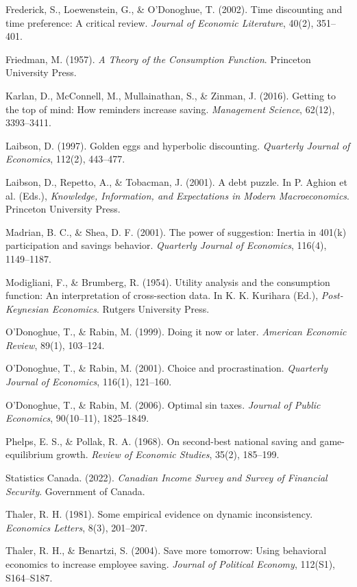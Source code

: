 \documentclass[12pt, letterpaper]{article}
\begin{document}
Frederick, S., Loewenstein, G., \& O'Donoghue, T. (2002). Time discounting and time preference: A critical review. \textit{Journal of Economic Literature}, 40(2), 351--401.

Friedman, M. (1957). \textit{A Theory of the Consumption Function}. Princeton University Press.

Karlan, D., McConnell, M., Mullainathan, S., \& Zinman, J. (2016). Getting to the top of mind: How reminders increase saving. \textit{Management Science}, 62(12), 3393--3411.

Laibson, D. (1997). Golden eggs and hyperbolic discounting. \textit{Quarterly Journal of Economics}, 112(2), 443--477.

Laibson, D., Repetto, A., \& Tobacman, J. (2001). A debt puzzle. In P. Aghion et al. (Eds.), \textit{Knowledge, Information, and Expectations in Modern Macroeconomics}. Princeton University Press.

Madrian, B. C., \& Shea, D. F. (2001). The power of suggestion: Inertia in 401(k) participation and savings behavior. \textit{Quarterly Journal of Economics}, 116(4), 1149--1187.

Modigliani, F., \& Brumberg, R. (1954). Utility analysis and the consumption function: An interpretation of cross-section data. In K. K. Kurihara (Ed.), \textit{Post-Keynesian Economics}. Rutgers University Press.

O'Donoghue, T., \& Rabin, M. (1999). Doing it now or later. \textit{American Economic Review}, 89(1), 103--124.

O'Donoghue, T., \& Rabin, M. (2001). Choice and procrastination. \textit{Quarterly Journal of Economics}, 116(1), 121--160.

O'Donoghue, T., \& Rabin, M. (2006). Optimal sin taxes. \textit{Journal of Public Economics}, 90(10--11), 1825--1849.

Phelps, E. S., \& Pollak, R. A. (1968). On second-best national saving and game-equilibrium growth. \textit{Review of Economic Studies}, 35(2), 185--199.

Statistics Canada. (2022). \textit{Canadian Income Survey and Survey of Financial Security}. Government of Canada.

Thaler, R. H. (1981). Some empirical evidence on dynamic inconsistency. \textit{Economics Letters}, 8(3), 201--207.

Thaler, R. H., \& Benartzi, S. (2004). Save more tomorrow: Using behavioral economics to increase employee saving. \textit{Journal of Political Economy}, 112(S1), S164--S187.
\end{document}
